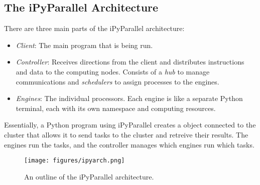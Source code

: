 \subsection*{The iPyParallel Architecture} %

There are three main parts of the iPyParallel architecture:
\begin{itemize}
\item \emph{Client}: The main program that is being run.
\item \emph{Controller}: Receives directions from the client and distributes instructions and data to the computing nodes.
Consists of a \emph{hub} to manage communications and \emph{schedulers} to assign processes to the engines.
\item \emph{Engines}: The individual processors.
Each engine is like a separate Python terminal, each with its own namespace and computing resources.
\end{itemize}

Essentially, a Python program using iPyParallel creates a  object connected to the cluster that allows it to send tasks to the cluster and retreive their results.
The engines run the tasks, and the controller manages which engines run which tasks.

\begin{comment} %
The \texttt{iPyParallel} architecture can be understood as a \emph{controller} that distributes messages (or commands) and \emph{engines} that receive the messages and run the processes.
The controller is comprised of a \emph{hub} to manage communications and \emph{schedulers} to assign processes to the engines.
Engines are distributed across computers or processor cores and have the sole task of running their assigned commands.
A diagram of the pieces of this architecture can be seen in Figure \ref{fig:ipyarch}.
\end{comment}

\begin{figure}[H]
    \texttt{[image: figures/ipyarch.png]}
\caption{An outline of the iPyParallel architecture.}
\label{fig:ipyarch}
\end{figure}

